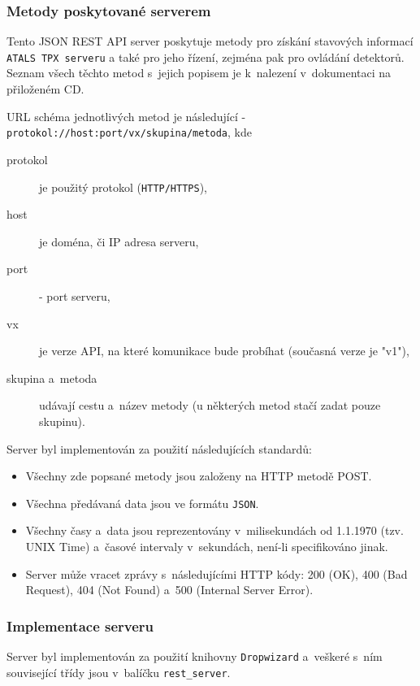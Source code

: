 \subsubsection{Metody poskytované serverem}
Tento JSON REST API server poskytuje metody pro získání stavových informací \texttt{ATALS TPX serveru} a také pro jeho řízení, zejména pak pro ovládání detektorů. Seznam všech těchto metod s~jejich popisem je k~nalezení v~dokumentaci na přiloženém CD.

URL schéma jednotlivých metod je následující - \texttt{protokol://host:port/vx/skupina/metoda}, kde
\begin{description}
	\item[protokol] je použitý protokol (\texttt{HTTP/HTTPS}),
	\item[host] je doména, či IP adresa serveru,
	\item[port] - port serveru,
	\item[vx] je verze API, na které komunikace bude probíhat (současná verze je "v1"),
	\item[skupina a~metoda] udávají cestu a~název metody (u některých metod stačí zadat pouze skupinu).
\end{description}

Server byl implementován za použití následujících standardů:
\begin{itemize}
	\item Všechny zde popsané metody jsou založeny na HTTP metodě POST.
	\item Všechna předávaná data jsou ve formátu \texttt{JSON}. 
	\item Všechny časy a~data jsou reprezentovány v~milisekundách od 1.1.1970 (tzv. UNIX Time) a~časové intervaly v~sekundách, není-li specifikováno jinak.
	\item Server může vracet zprávy s~následujícími HTTP kódy: 200 (OK), 400 (Bad Request), 404 (Not Found) a~500 (Internal Server Error).
\end{itemize}


\subsubsection{Implementace serveru}\label{atlas:cont:api:init}
Server byl implementován za použití knihovny \texttt{Dropwizard} a~veškeré s~ním související třídy jsou v~balíčku \texttt{rest\_server}.

